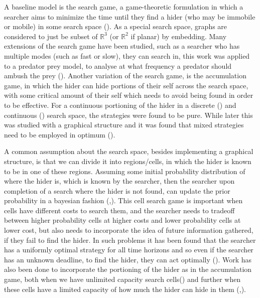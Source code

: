 \documentclass[a4paper,10pt]{article}
\theoremstyle{definition}
\theoremstyle{definition}
\theoremstyle{remark}
\theoremstyle{definition}
\begin{document}
A baseline model is the search game, a game-theoretic formulation in which a searcher aims to minimize the time until they find a hider (who may be immobile or mobile) in some search space (\cite{Steve2003}). As a special search space, graphs are considered to just be subset of $\mathbb{R}^{3}$ (or $\mathbb{R}^{2}$ if planar) by embedding. Many extensions of the search game have been studied, such as a searcher who has multiple modes (such as fast or slow), they can search in, this work was applied to a predator prey model, to analyse at what frequency a predator should ambush the prey (\cite{Alpern2011a}). Another variation of the search game, is the accumulation game, in which the hider can hide portions of their self across the search space, with some critical amount of their self which needs to avoid being found in order to be effective. For a continuous portioning of the hider in a discrete (\cite{Kikuta2002a}) and continuous (\cite{Ruckle2000}) search space, the strategies were found to be pure. While later this was studied with a graphical structure and it was found that mixed strategies need to be employed in optimum (\cite{Alpern2014}).

A common assumption about the search space, besides implementing a graphical structure, is that we can divide it into regions/cells, in which the hider is known to be in one of these regions. Assuming some initial probability distribution of where the hider is, which is known by the searcher, then the searcher upon completion of a search where the hider is not found, can update the prior probability in a bayesian fashion (\cite{Black1965},\cite{Matula1964}). This cell search game is important when cells have different costs to search them, and the searcher needs to tradeoff between higher probability cells at higher costs and lower probability cells at lower cost, but also needs to incorporate the idea of future information gathered, if they fail to find the hider. In such problems it has been found that the searcher has a uniformly optimal strategy for all time horizons and so even if the searcher has an unknown deadline, to find the hider, they can act optimally (\cite{Lin2016}). Work has also been done to incorporate the portioning of the hider as in the accumulation game, both when we have unlimited capacity search cells(\cite{Ruckle1983}) and further when these cells have a limited capacity of how much the hider can hide in them (\cite{Zoroa1999},\cite{Zoroa2004}).
\end{document}
